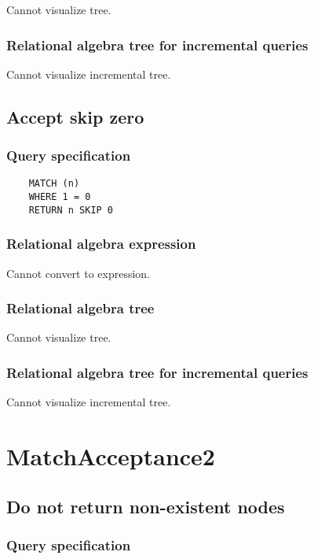 	Cannot visualize tree.

	\subsubsection*{Relational algebra tree for incremental queries}

	Cannot visualize incremental tree.
	\subsection{Accept skip zero}

	\subsubsection*{Query specification}

	\begin{lstlisting}
	MATCH (n)
	WHERE 1 = 0
	RETURN n SKIP 0
	\end{lstlisting}


	\subsubsection*{Relational algebra expression}

	Cannot convert to expression.

	\subsubsection*{Relational algebra tree}

	Cannot visualize tree.

	\subsubsection*{Relational algebra tree for incremental queries}

	Cannot visualize incremental tree.

	\section{MatchAcceptance2}

	\subsection{Do not return non-existent nodes}

	\subsubsection*{Query specification}

